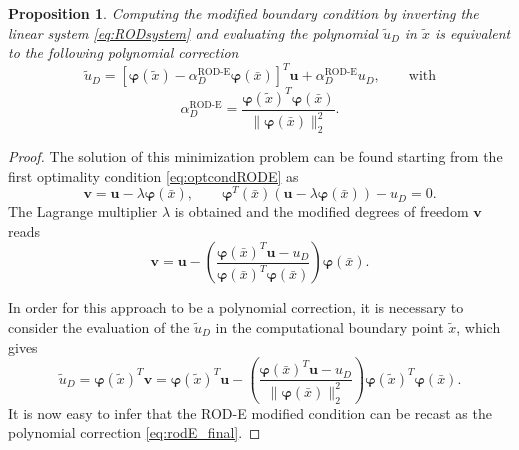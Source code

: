 \documentclass{article}
\renewcommand{\phi}{\varphi}
\newtheorem{proposition}[theorem]{Proposition}%
\begin{document}
\begin{proposition}
Computing the modified boundary condition by inverting the linear system \eqref{eq:RODsystem} and evaluating the polynomial $\tilde u_D$ in $\tilde x$ is equivalent to the following polynomial correction
\begin{equation}\label{eq:rodE_final}
    \tilde{u}_D = [\boldsymbol{\phi}(\tilde x) - \alpha^{\text{ROD-E}}_D \boldsymbol{\phi}(\bar x)]^T \boldsymbol{u} + \alpha^{\text{ROD-E}}_D u_D , \quad \quad \text{with}
\end{equation}
\begin{equation}\label{eq:alpha_rod_e}
    \alpha^{\text{ROD-E}}_D = \frac{\boldsymbol{\phi}(\tilde{x})^T \boldsymbol{\phi}(\bar{x})}{\|\boldsymbol{\phi}(\bar{x})\|^2_2}.   
\end{equation}
\end{proposition}

\begin{proof}
The solution of this minimization problem can be found starting from the first optimality condition \eqref{eq:optcondRODE} as
\begin{equation}
   \boldsymbol{v} = \boldsymbol{u} - \lambda  \boldsymbol{\phi}(\bar x), \qquad \boldsymbol{\phi}^T(\bar x) (\boldsymbol{u} - \lambda  \boldsymbol{\phi}(\bar x)) - u_D = 0.
\end{equation}
The Lagrange multiplier $\lambda$ is obtained and the modified degrees of freedom $\boldsymbol{v}$ reads
\begin{equation}
\boldsymbol{v} = \boldsymbol{u} - \left( \frac{\boldsymbol{\phi}(\bar{x})^T \boldsymbol{u} - u_D}{\boldsymbol{\phi}(\bar{x})^T \boldsymbol{\phi}(\bar{x})} \right) \boldsymbol{\phi}(\bar{x}).
\end{equation}

In order for this approach to be a polynomial correction, it is necessary to consider the evaluation of the $\tilde u_D$ in the computational boundary point $\tilde x$, which gives
\begin{equation}
    \tilde u_D = \boldsymbol{\phi}(\tilde{x})^T \boldsymbol{v} = \boldsymbol{\phi}(\tilde{x})^T \boldsymbol{u} - \left( \frac{\boldsymbol{\phi}(\bar{x})^T \boldsymbol{u} - u_D}{\|\boldsymbol{\phi}(\bar{x})\|^2_2} \right) \boldsymbol{\phi}(\tilde{x})^T \boldsymbol{\phi}(\bar{x}).
\end{equation}
It is now easy to infer that the ROD-E modified condition can be recast as the polynomial correction \eqref{eq:rodE_final}.
\end{proof}
\end{document}
